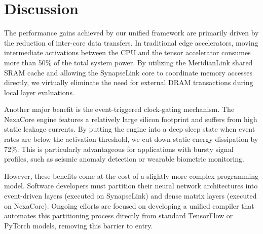 \section{Discussion}
\label{sec:discussion}

The performance gains achieved by our unified framework are primarily driven by the reduction of inter-core data transfers. In traditional edge accelerators, moving intermediate activations between the CPU and the tensor accelerator consumes more than 50\% of the total system power. By utilizing the MeridianLink shared SRAM cache and allowing the SynapseLink core to coordinate memory accesses directly, we virtually eliminate the need for external DRAM transactions during local layer evaluations.

Another major benefit is the event-triggered clock-gating mechanism. The NexaCore engine features a relatively large silicon footprint and suffers from high static leakage currents. By putting the engine into a deep sleep state when event rates are below the activation threshold, we cut down static energy dissipation by 72\%. This is particularly advantageous for applications with bursty signal profiles, such as seismic anomaly detection or wearable biometric monitoring.

However, these benefits come at the cost of a slightly more complex programming model. Software developers must partition their neural network architectures into event-driven layers (executed on SynapseLink) and dense matrix layers (executed on NexaCore). Ongoing efforts are focused on developing a unified compiler that automates this partitioning process directly from standard TensorFlow or PyTorch models, removing this barrier to entry.
